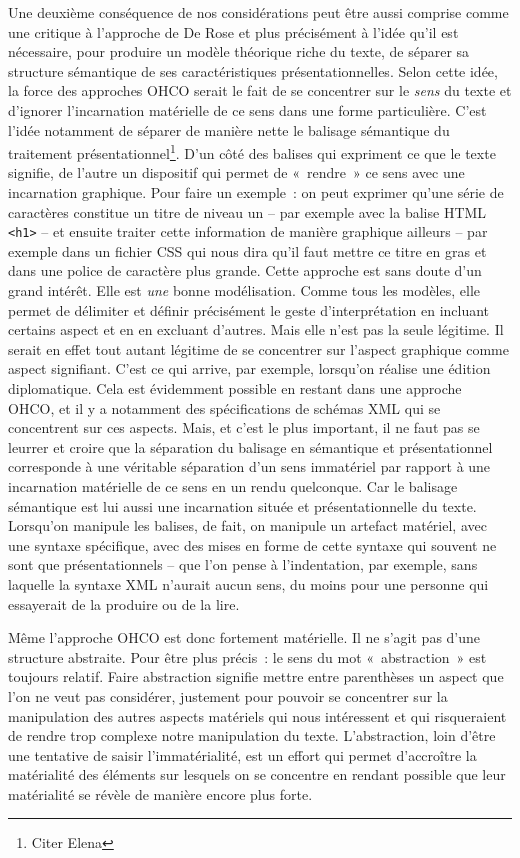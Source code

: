 Une deuxième conséquence de nos considérations peut être aussi comprise
comme une critique à l'approche de De Rose et plus précisément à l'idée
qu'il est nécessaire, pour produire un modèle théorique riche du texte,
de séparer sa structure sémantique de ses caractéristiques
présentationnelles. Selon cette idée, la force des approches OHCO serait
le fait de se concentrer sur le \emph{sens} du texte et d'ignorer
l'incarnation matérielle de ce sens dans une forme particulière. C'est
l'idée notamment de séparer de manière nette le balisage sémantique du
traitement présentationnel\footnote{Citer Elena}. D'un côté des balises
qui expriment ce que le texte signifie, de l'autre un dispositif qui
permet de «~rendre~» ce sens avec une incarnation graphique. Pour faire
un exemple~: on peut exprimer qu'une série de caractères constitue un
titre de niveau un -- par exemple avec la balise HTML
\texttt{\textless{}h1\textgreater{}} -- et ensuite traiter cette
information de manière graphique ailleurs -- par exemple dans un fichier
CSS qui nous dira qu'il faut mettre ce titre en gras et dans une police
de caractère plus grande. Cette approche est sans doute d'un grand
intérêt. Elle est \emph{une} bonne modélisation. Comme tous les modèles,
elle permet de délimiter et définir précisément le geste
d'interprétation en incluant certains aspect et en en excluant d'autres.
Mais elle n'est pas la seule légitime. Il serait en effet tout autant
légitime de se concentrer sur l'aspect graphique comme aspect
signifiant. C'est ce qui arrive, par exemple, lorsqu'on réalise une
édition diplomatique. Cela est évidemment possible en restant dans une
approche OHCO, et il y a notamment des spécifications de schémas XML qui
se concentrent sur ces aspects. Mais, et c'est le plus important, il ne
faut pas se leurrer et croire que la séparation du balisage en
sémantique et présentationnel corresponde à une véritable séparation
d'un sens immatériel par rapport à une incarnation matérielle de ce sens
en un rendu quelconque. Car le balisage sémantique est lui aussi une
incarnation située et présentationnelle du texte. Lorsqu'on manipule les
balises, de fait, on manipule un artefact matériel, avec une syntaxe
spécifique, avec des mises en forme de cette syntaxe qui souvent ne sont
que présentationnels -- que l'on pense à l'indentation, par exemple,
sans laquelle la syntaxe XML n'aurait aucun sens, du moins pour une
personne qui essayerait de la produire ou de la lire.

Même l'approche OHCO est donc fortement matérielle. Il ne s'agit pas
d'une structure abstraite. Pour être plus précis~: le sens du mot
«~abstraction~» est toujours relatif. Faire abstraction signifie mettre
entre parenthèses un aspect que l'on ne veut pas considérer, justement
pour pouvoir se concentrer sur la manipulation des autres aspects
matériels qui nous intéressent et qui risqueraient de rendre trop
complexe notre manipulation du texte. L'abstraction, loin d'être une
tentative de saisir l'immatérialité, est un effort qui permet
d'accroître la matérialité des éléments sur lesquels on se concentre en
rendant possible que leur matérialité se révèle de manière encore plus
forte.

